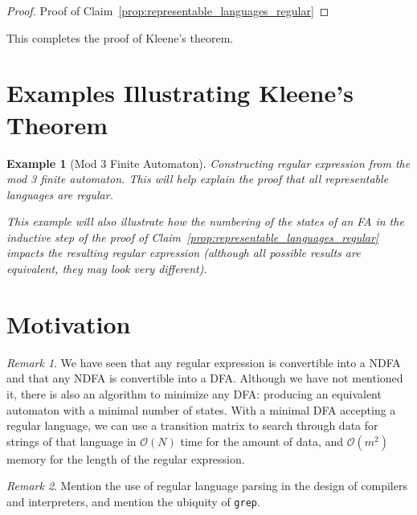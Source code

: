 \documentclass[12 pt, twoside, letterpaper]{article}
\newcommand{\meo}[1]{\texttt{#1}}
\renewcommand{\meo}[1]{\iffalse #1 \fi}
\newcommand{\bigo}{\mathcal{O}}
\newcommand{\refprop}[1]{Claim~\ref{#1}}
\theoremstyle{definition}
\theoremstyle{remark}
\newtheorem*{remark}{Remark}
\theoremstyle{plain}
\newtheorem*{example}{Example}
\begin{document}
	\begin{proof}
		Proof of \refprop{prop:representable_languages_regular}
	\end{proof}
	

	This completes the proof of Kleene's theorem.



\section{Examples Illustrating Kleene's Theorem} %
\label{sec:examples}

	\begin{example}[Mod 3 Finite Automaton]
		Constructing regular expression from the mod 3 finite automaton.
		This will help explain the proof that all representable languages are regular.

		This example will also illustrate how the numbering of the states of an FA in the inductive step of the proof of \refprop{prop:representable_languages_regular} impacts the resulting regular expression (although all possible results are equivalent, they may look very different).
	\end{example}

	\meo{
		Figure out if there are any other parts of the proof that deserve an example to help explain them.
		I will probably include pictures for regular language $\iff$ representable in the initial proof.
	}


\section{Motivation} %
\label{sec:motivation}
	\begin{remark}
		We have seen that any regular expression is convertible into a NDFA and that any NDFA is convertible into a DFA.
		Although we have not mentioned it, there is also an algorithm to minimize any DFA: producing an equivalent automaton with a minimal number of states. 
		With a minimal DFA accepting a regular language, we can use a transition matrix to search through data for strings of that language in $\bigo(N)$ time for the amount of data, and $\bigo(m^2)$ memory for the length of the regular expression.
	\end{remark}

	\begin{remark}
		Mention the use of regular language parsing in the design of compilers and interpreters, and mention the ubiquity of \texttt{grep}.
	\end{remark}
\meo{
	Look into any background or motivation that might be good to include.
	Anything about the importance of Kleene's theorem to the implementation of actual software might be good to include.
	But I worry about including too much practical CS in what really should be a math paper.

	It might be cool to cover the minimization stuff if I have extra time and space---although it would add a lot of content to the paper.

}
\end{document}
